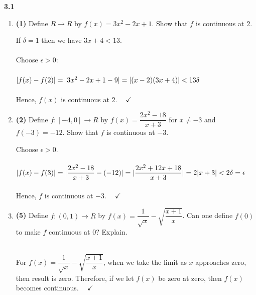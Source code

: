 \documentclass[fleqn]{article}
\begin{document}
  \textbf{3.1}
  \begin{enumerate}
    \item \textbf{(1)} Define $R \longrightarrow R$ by $f(x)=3x^2-2x+1$. Show that $f$ is continuous at $2$.

      \textcolor{hwColor}{
        If $\delta=1$ then we have $3x+4 < 13$.
        \\
        \\
        Choose $\epsilon>0$:
        \\
        \\
        $
          |f(x)-f(2)|
          \\
          \\
          =|3x^2-2x+1-9|
          \\
          \\
          =|(x-2)(3x+4)| < 13 \delta
        $
        \\
        \\
        Hence, $f(x)$ is continuous at $2$. $~~~~ \checkmark$
      }


    \item \textbf{(2)} Define $f: [-4, 0] \longrightarrow R$ by $f(x)=\dfrac{2x^2-18}{x+3}$ for $x \neq -3$ and $f(-3)=-12$. Show 
    that $f$ is continuous at $-3$.

      \textcolor{hwColor}{
        Choose $\epsilon > 0$.
        \\
        \\
        $
          |f(x)-f(3)|
          \\
          \\
          =|\dfrac{2x^2-18}{x+3}-(-12)|
          \\
          \\
          =|\dfrac{2x^2+12x+18}{x+3}|
          \\
          \\
          =2|x+3| < 2 \delta=\epsilon
        $
        \\
        \\
        Hence, $f$ is continuous at $-3$. $~~~~ \checkmark$
      }


    \item \textbf{(5)} Define $f: (0, 1) \longrightarrow R$ by $f(x)=\dfrac{1}{\sqrt{x}}-\sqrt{\dfrac{x+1}{x}}$. Can one define
    $f(0)$ to make $f$ continuous at $0$? Explain. 

      \textcolor{hwColor}{
        \\
        For $f(x)=\dfrac{1}{\sqrt{x}}-\sqrt{\dfrac{x+1}{x}}$, when we take the limit as $x$ approaches zero, 
        then result is zero. Therefore, if we let $f(x)$ be zero at zero, then $f(x)$ becomes continuous. $~~~~ \checkmark$
        \\
      }



\end{enumerate}
\end{document}
